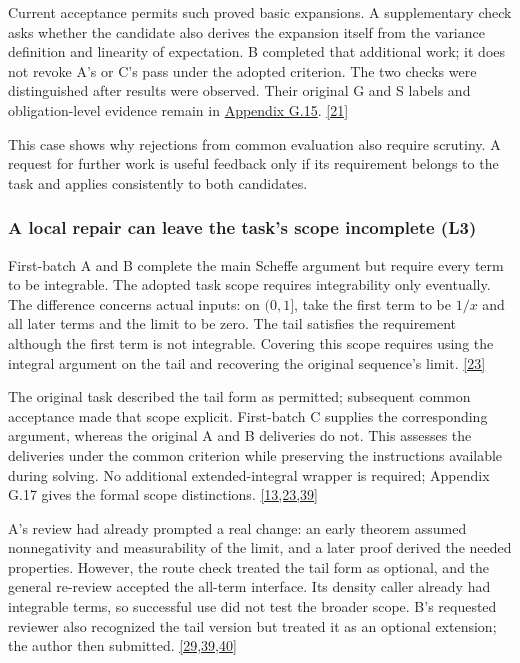 Current acceptance permits such proved basic expansions. A supplementary check asks whether the candidate also derives the expansion itself from the variance definition and linearity of expectation. B completed that additional work; it does not revoke A's or C's pass under the adopted criterion. The two checks were distinguished after results were observed. Their original G and S labels and obligation-level evidence remain in \href{en-appendix.pdf\#g15}{Appendix G.15}. \href{en.pdf\#ref-21}{\mbox{[21]}}

This case shows why rejections from common evaluation also require scrutiny. A request for further work is useful feedback only if its requirement belongs to the task and applies consistently to both candidates.

\subsubsection[A local repair can leave the task's scope incomplete (L3)]{\texorpdfstring{\protect\hypertarget{r1-2}{}A local repair can leave the task's scope incomplete (L3)}{A local repair can leave the task's scope incomplete (L3)}}
First-batch A and B complete the main Scheffe argument but require every term to be integrable. The adopted task scope requires integrability only eventually. The difference concerns actual inputs: on $(0,1]$, take the first term to be $1/x$ and all later terms and the limit to be zero. The tail satisfies the requirement although the first term is not integrable. Covering this scope requires using the integral argument on the tail and recovering the original sequence's limit. \href{en.pdf\#ref-23}{\mbox{[23]}}

The original task described the tail form as permitted; subsequent common acceptance made that scope explicit. First-batch C supplies the corresponding argument, whereas the original A and B deliveries do not. This assesses the deliveries under the common criterion while preserving the instructions available during solving. No additional extended-integral wrapper is required; Appendix G.17 gives the formal scope distinctions. \href{en.pdf\#ref-13}{\mbox{[13,23,39]}}

A's review had already prompted a real change: an early theorem assumed nonnegativity and measurability of the limit, and a later proof derived the needed properties. However, the route check treated the tail form as optional, and the general re-review accepted the all-term interface. Its density caller already had integrable terms, so successful use did not test the broader scope. B's requested reviewer also recognized the tail version but treated it as an optional extension; the author then submitted. \href{en.pdf\#ref-29}{\mbox{[29,39,40]}}

